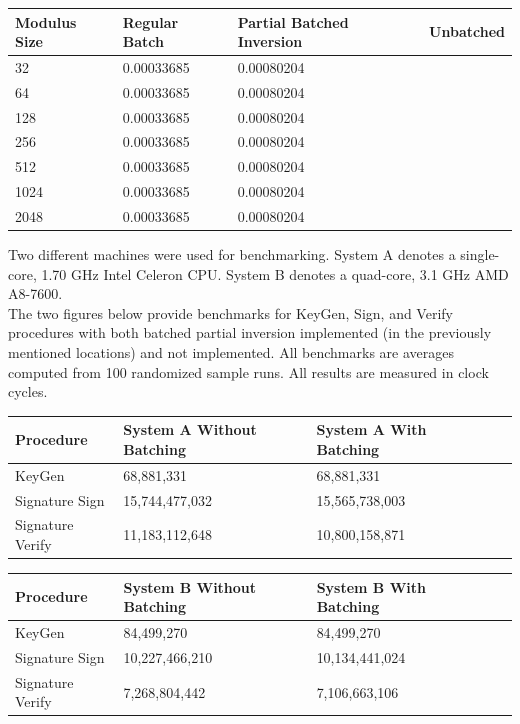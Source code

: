 \begin{center}
\begin{tabular}{@{}llll@{}}
	\toprule
	Modulus Size & Regular Batch & Partial Batched Inversion & Unbatched \\
	\midrule
	32 & 0.00033685 & 0.00080204\\
	64 & 0.00033685 & 0.00080204\\
	128 & 0.00033685 & 0.00080204\\
	256 & 0.00033685 & 0.00080204\\
	512 & 0.00033685 & 0.00080204\\
	1024 & 0.00033685 & 0.00080204\\
	2048 & 0.00033685 & 0.00080204\\
	\bottomrule
\end{tabular}
\end{center}

Two different machines were used for benchmarking. System A denotes a single-core, 1.70 GHz Intel Celeron CPU. System B denotes a quad-core, 3.1 GHz AMD A8-7600.\\

The two figures below provide benchmarks for KeyGen, Sign, and Verify procedures with both batched partial inversion implemented (in the previously mentioned locations) and not implemented. All benchmarks are averages computed from 100 randomized sample runs. All results are measured in clock cycles.

\begin{center}
\begin{tabular}{@{}lllll@{}}
	\toprule
	Procedure & System A Without Batching & System A With Batching\\
	\midrule
	KeyGen & 68,881,331 & 68,881,331\\
	Signature Sign & 15,744,477,032 & 15,565,738,003\\
	Signature Verify & 11,183,112,648 & 10,800,158,871\\
	\bottomrule
\end{tabular}
\end{center}

\begin{center}
\begin{tabular}{@{}lllll@{}}
	\toprule
	Procedure & System B Without Batching & System B With Batching\\
	\midrule
	KeyGen & 84,499,270 & 84,499,270\\
	Signature Sign & 10,227,466,210 & 10,134,441,024\\
	Signature Verify & 7,268,804,442 & 7,106,663,106\\
	\bottomrule
\end{tabular}
\end{center}

